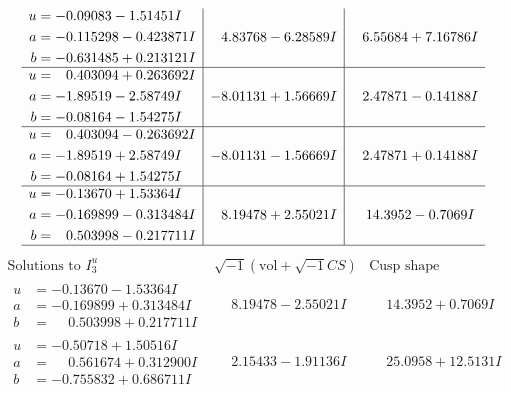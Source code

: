 \documentclass[1p]{elsarticle_modified}
\theoremstyle{definition}
\newcommand{\I}{\sqrt{-1}}
\begin{document}
$$\begin{array}{c|c|c}
\begin{aligned}
u &= -0.09083 - 1.51451 I \\
a &= -0.115298 - 0.423871 I \\
b &= -0.631485 + 0.213121 I\end{aligned}
 & \phantom{-}4.83768 - 6.28589 I & \phantom{-}6.55684 + 7.16786 I \\ \hline\begin{aligned}
u &= \phantom{-}0.403094 + 0.263692 I \\
a &= -1.89519 - 2.58749 I \\
b &= -0.08164 - 1.54275 I\end{aligned}
 & -8.01131 + 1.56669 I & \phantom{-}2.47871 - 0.14188 I \\ \hline\begin{aligned}
u &= \phantom{-}0.403094 - 0.263692 I \\
a &= -1.89519 + 2.58749 I \\
b &= -0.08164 + 1.54275 I\end{aligned}
 & -8.01131 - 1.56669 I & \phantom{-}2.47871 + 0.14188 I \\ \hline\begin{aligned}
u &= -0.13670 + 1.53364 I \\
a &= -0.169899 - 0.313484 I \\
b &= \phantom{-}0.503998 - 0.217711 I\end{aligned}
 & \phantom{-}8.19478 + 2.55021 I & \phantom{-}14.3952 - 0.7069 I\\
 \hline 
 \end{array}$$\newpage$$\begin{array}{c|c|c}  
\text{Solutions to }I^u_{3}& \I (\text{vol} + \sqrt{-1}CS) & \text{Cusp shape}\\
 \hline 
\begin{aligned}
u &= -0.13670 - 1.53364 I \\
a &= -0.169899 + 0.313484 I \\
b &= \phantom{-}0.503998 + 0.217711 I\end{aligned}
 & \phantom{-}8.19478 - 2.55021 I & \phantom{-}14.3952 + 0.7069 I \\ \hline\begin{aligned}
u &= -0.50718 + 1.50516 I \\
a &= \phantom{-}0.561674 + 0.312900 I \\
b &= -0.755832 + 0.686711 I\end{aligned}
 & \phantom{-}2.15433 - 1.91136 I & \phantom{-}25.0958 + 12.5131 I \\ \hline\begin{aligned}

\end{aligned}
\end{array}$$
\end{document}
